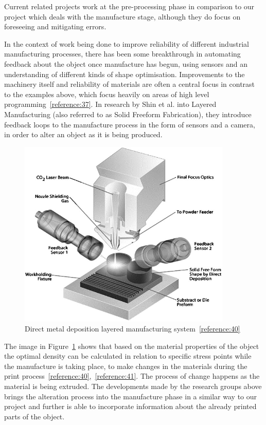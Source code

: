 \documentclass[11pt]{report} %
\begin{document}
Current related projects work at the pre-processing phase in comparison to our project which deals with the manufacture stage, although they do focus on foreseeing and mitigating errors. 

In the context of work being done to improve reliability of different industrial manufacturing processes, there has been some breakthrough in automating feedback about the object once manufacture has begun, using sensors and an understanding of different kinds of shape optimisation. Improvements to the machinery itself and reliability of materials are often a central focus in contrast to the examples above, which focus heavily on areas of high level programming~\ref{reference:37}. In research by Shin et al. into Layered Manufacturing (also referred to as Solid Freeform Fabrication), they introduce feedback loops to the manufacture process in the form of sensors and a camera, in order to alter an object as it is being produced.

\begin{figure}[H]
  \centering
  \includegraphics[width=4in]{shin.jpg}
  \caption{Direct metal deposition layered manufacturing system~\ref{reference:40}}
  \label{figure:Shin}
\end{figure}

The image in Figure~\ref{figure:Shin} shows that based on the material properties of the object the optimal density can be calculated in relation to specific stress points while the manufacture is taking place, to make changes in the materials during the print process~\ref{reference:40},~\ref{reference:41}. The process of change happens as the material is being extruded. The developments made by the research groups above brings the alteration process into the manufacture phase in a similar way to our project and further is able to incorporate information about the already printed parts of the object.  
\end{document}
